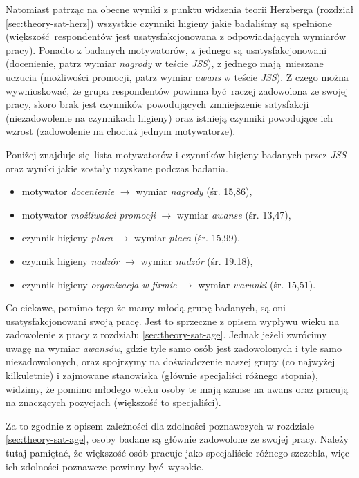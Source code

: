 Natomiast patrząc na obecne wyniki z punktu widzenia teorii Herzberga (rozdział \ref{sec:theory-sat-herz}) wszystkie czynniki higieny jakie badaliśmy są spełnione (większość respondentów jest usatysfakcjonowana z odpowiadających wymiarów pracy). Ponadto z badanych motywatorów, z jednego są usatysfakcjonowani (docenienie, patrz wymiar \textit{nagrody} w teście \emph{JSS}), z jednego mają mieszane uczucia (możliwości promocji, patrz wymiar \textit{awans} w teście \emph{JSS}). Z czego można wywnioskować, że
grupa respondentów powinna być raczej zadowolona ze swojej pracy, skoro brak jest czynników powodujących zmniejszenie satysfakcji (niezadowolenie na czynnikach higieny) oraz istnieją czynniki powodujące ich wzrost (zadowolenie na chociaż jednym motywatorze). 

Poniżej znajduje się lista motywatorów i czynników higieny badanych przez \emph{JSS} oraz wyniki jakie zostały uzyskane podczas badania.

\begin{itemize}
  \item motywator \textit{docenienie} $\rightarrow$ wymiar \textit{nagrody} (śr. 15,86),
  \item motywator \textit{możliwości promocji} $\rightarrow$ wymiar \textit{awanse} (śr. 13,47),
  \item czynnik higieny \textit{płaca} $\rightarrow$ wymiar \textit{płaca} (śr. 15,99),
  \item czynnik higieny \textit{nadzór} $\rightarrow$ wymiar \textit{nadzór} (śr. 19.18),
  \item czynnik higieny \textit{organizacja w firmie} $\rightarrow$ wymiar \textit{warunki} (śr. 15,51).
\end{itemize}

Co ciekawe, pomimo tego że mamy młodą grupę badanych, są oni usatysfakcjonowani swoją pracę. Jest to sprzeczne z opisem wypływu wieku na zadowolenie z pracy z rozdziału \ref{sec:theory-sat-age}. Jednak jeżeli zwrócimy uwagę na wymiar \textit{awansów}, gdzie tyle samo osób jest zadowolonych i tyle samo niezadowolonych, oraz spojrzymy na doświadczenie naszej grupy (co najwyżej kilkuletnie) i zajmowane stanowiska (głównie specjaliści różnego stopnia), widzimy, że pomimo młodego wieku
osoby te mają szanse na awans oraz pracują na znaczących pozycjach (większość to specjaliści).

Za to zgodnie z opisem zależności dla zdolności poznawczych w rozdziale \ref{sec:theory-sat-age}, osoby badane są głównie zadowolone ze swojej pracy. Należy tutaj pamiętać, że większość osób pracuje jako specjaliście różnego szczebla, więc ich zdolności poznawcze powinny być wysokie.

